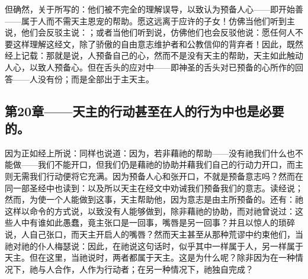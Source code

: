 但确然，关于所写的：他们被不完全的理解误导，以致认为预备人心——即开始善——属于人而不需天主恩宠的帮助。愿这远离于应许的子女！仿佛当他们听到主说，他们会反驳主说：；或者当他们听到说，仿佛他们也会反驳他说：愿任何人不要这样理解这经文，除了骄傲的自由意志维护者和公教信仰的背弃者！因此，既然经上记载：那就是说，人预备自己的心，然而不是没有天主的帮助，天主如此触动人心，以致人预备心。但在舌头的应对中——即神圣的舌头对已预备的心所作的回答——人没有份；而是全部出于主天主。\par


\subsection{第20章——天主的行动甚至在人的行为中也是必要的。}

因为正如经上所说：同样也说道：因为，若非藉祂的帮助——没有祂我们什么也不能做——我们不能开口，但我们仍是藉祂的协助并藉我们自己的行动力开口，而主则无需我们行动便将它充满。因为预备人心和张开口，不就是预备意志吗？然而在同一部圣经中也读到：以及所以天主在经文中劝诫我们预备我们的意志。读经说；然而，为使一个人能做到这事，天主帮助他，因为意志是由主所预备的。还有：祂这样以命令的方式说，以致没有人能够做到，除非藉祂的协助，而对祂曾说过：这些人中有谁如此愚蠢，竟主张口是一回事，嘴唇是另一回事？并且以惊人的琐碎说，人自己张口，而天主开启人的嘴唇？然而天主甚至从那种荒谬中约束他们，当祂对祂的仆人梅瑟说：因此，在祂说这句话时，似乎其中一样属于人，另一样属于天主。但在这里，当祂说时，两者都属于天主。这是为什么呢？除非因为在一种情况下，祂与人合作，人作为行动者；在另一种情况下，祂独自完成？\par

